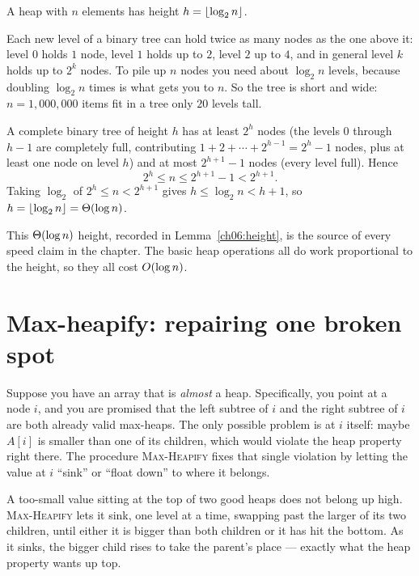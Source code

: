 \begin{lemma}
\label{ch06:height}
A heap with $n$ elements has height $h = \lfloor\log_2 n\rfloor$.
\end{lemma}

\begin{intuitionbox}
Each new level of a binary tree can hold twice as many nodes as the one above
it: level $0$ holds $1$ node, level $1$ holds up to $2$, level $2$ up to $4$, and
in general level $k$ holds up to $2^k$ nodes. To pile up $n$ nodes you need about
$\log_2 n$ levels, because doubling $\log_2 n$ times is what gets you to $n$. So
the tree is short and wide: $n = 1{,}000{,}000$ items fit in a tree only $20$
levels tall.
\end{intuitionbox}

\begin{formalbox}
A complete binary tree of height $h$ has at least $2^h$ nodes (the levels
$0$ through $h-1$ are completely full, contributing $1+2+\cdots+2^{h-1} =
2^h - 1$ nodes, plus at least one node on level $h$) and at most $2^{h+1}-1$
nodes (every level full). Hence
\[
  2^h \le n \le 2^{h+1}-1 < 2^{h+1}.
\]
Taking $\log_2$ of $2^h \le n < 2^{h+1}$ gives $h \le \log_2 n < h+1$, so
$h = \lfloor\log_2 n\rfloor = \Theta(\log n)$.
\end{formalbox}

This $\Theta(\log n)$ height, recorded in Lemma~\ref{ch06:height}, is the source of
every speed claim in the chapter. The basic heap operations all do work
proportional to the height, so they all cost $O(\log n)$.

\section{Max-heapify: repairing one broken spot}

Suppose you have an array that is \emph{almost} a heap.
Specifically, you point at a node $i$, and you are promised that the left subtree
of $i$ and the right subtree of $i$ are both already valid max-heaps. The only
possible problem is at $i$ itself: maybe $A[i]$ is smaller than one of its
children, which would violate the heap property right there. The procedure
\textsc{Max-Heapify} fixes that single violation by letting the value at $i$
``sink'' or ``float down'' to where it belongs.

\begin{intuitionbox}
A too-small value sitting at the top of two good heaps does not belong up
high. \textsc{Max-Heapify} lets it
sink, one level at a time, swapping past the larger of its two children, until
either it is bigger than both children or it has hit the bottom. As it sinks, the
bigger child rises to take the parent's place --- exactly what the heap property
wants up top.
\end{intuitionbox}

